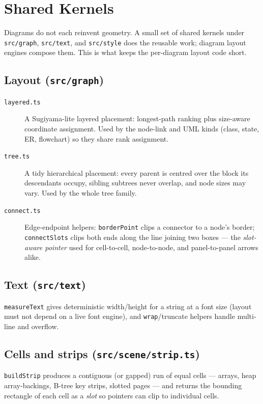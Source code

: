 \section{Shared Kernels}
\label{sec:kernels}

Diagrams do not each reinvent geometry. A small set of shared kernels under
\texttt{src/graph}, \texttt{src/text}, and \texttt{src/style} does the reusable
work; diagram layout engines compose them. This is what keeps the per-diagram
layout code short.

\subsection{Layout (\texttt{src/graph})}

\begin{description}
  \item[\texttt{layered.ts}] A Sugiyama-lite layered placement: longest-path
        ranking plus size-aware coordinate assignment. Used by the node-link and
        UML kinds (class, state, ER, flowchart) so they share rank assignment.
  \item[\texttt{tree.ts}] A tidy hierarchical placement: every parent is
        centred over the block its descendants occupy, sibling subtrees never
        overlap, and node sizes may vary. Used by the whole tree family.
  \item[\texttt{connect.ts}] Edge-endpoint helpers: \texttt{borderPoint} clips a
        connector to a node's border; \texttt{connectSlots} clips both ends along
        the line joining two boxes --- the \emph{slot-aware pointer} used for
        cell-to-cell, node-to-node, and panel-to-panel arrows alike.
\end{description}

\subsection{Text (\texttt{src/text})}

\texttt{measureText} gives deterministic width/height for a string at a font
size (layout must not depend on a live font engine), and \texttt{wrap}/truncate
helpers handle multi-line and overflow.

\subsection{Cells and strips (\texttt{src/scene/strip.ts})}

\texttt{buildStrip} produces a contiguous (or gapped) run of equal cells ---
arrays, heap array-backings, B-tree key strips, slotted pages --- and returns the
bounding rectangle of each cell as a \emph{slot} so pointers can clip to
individual cells.

